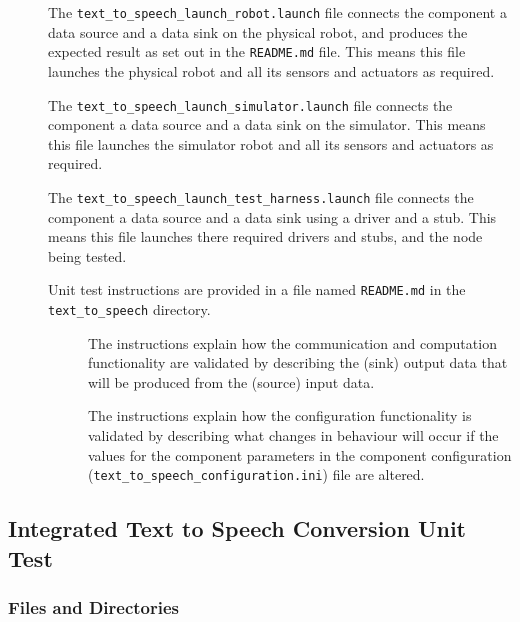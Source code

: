 \documentclass{CSSRforAfrica}
\newcommand{\checkboxDashed}{\fbox{--}}         %
\begin{document}
\begin{description}
\item[\checkboxDashed] The {\small \verb+text_to_speech_launch_robot.launch+} file  connects the component a data source and a data sink on the physical robot, and produces the expected result as set out in the  \small {\texttt{README.md}}   file.    This means this file launches the physical robot and all its sensors and actuators as required.

\item[\checkboxDashed] The {\small \verb+text_to_speech_launch_simulator.launch+} file  connects the component a data source and a data sink on the simulator.    This means this file launches the simulator robot and all its sensors and actuators as required.

\item[\checkboxDashed] The {\small \verb+text_to_speech_launch_test_harness.launch+} file  connects the component a data source and a data sink using a driver and a stub.   This means this file launches there required drivers and stubs, and the node being tested.

\item[\checkboxDashed] Unit test instructions are provided in a file named {\small \verb+README.md+} in the {\small \verb+text_to_speech+} directory.

\begin{description}

\item[\checkboxDashed] The instructions  explain how the  communication and computation functionality are validated by describing the (sink) output data that will be produced from the (source) input data.  

\item[\checkboxDashed] The instructions  explain how the  configuration functionality is validated by describing what changes in behaviour will occur if the values for the component parameters in the component configuration ({\small \verb+text_to_speech_configuration.ini+}) file are altered.

\end{description}

\end{description}

\subsection{Integrated Text to Speech Conversion Unit Test}

\subsubsection{Files and Directories}
\end{document}
